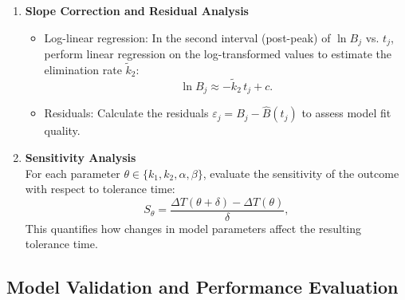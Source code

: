 \documentclass[11pt]{article}
\begin{document}
\begin{enumerate}
\[\begin{tikzpicture}
\begin{axis}
            \addplot[dashed] coordinates {(2,0) (2,0.08)};
            \node[above right] at (axis cs:2,0.08) {$t_i$};
            
            \addplot[dashed] coordinates {(6,0) (6,0.01)};
            \node[below right] at (axis cs:6,0.01) {$t_f$};
          \end{axis}
        \end{tikzpicture}
    \]

  \item \textbf{Slope Correction and Residual Analysis}\\
    \begin{itemize}
      \item Log-linear regression: 
        In the second interval (post-peak) of \(\ln B_j\) vs. \(t_j\), perform linear regression on the log-transformed values to estimate the elimination rate \(\tilde k_2\):
        \[
          \ln B_j \approx -\tilde k_2\,t_j + c.
        \]
      \item Residuals:  
        Calculate the residuals \(\varepsilon_j = B_j - \widehat B(t_j)\) to assess model fit quality.
    \end{itemize}

  \item \textbf{Sensitivity Analysis}\\
    For each parameter \(\theta\in\{k_1,k_2,\alpha,\beta\}\), evaluate the sensitivity of the outcome with respect to tolerance time:
    \[
      S_\theta = \frac{\Delta T(\theta + \delta) - \Delta T(\theta)}{\delta},
    \]
    This quantifies how changes in model parameters affect the resulting tolerance time.
\end{enumerate}

\subsection{Model Validation and Performance Evaluation}

\label{subsec:validation}
\end{document}
